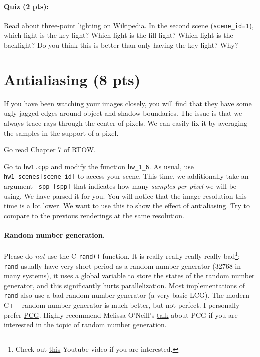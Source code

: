 \paragraph{Quiz (2 pts):} Read about \href{https://en.wikipedia.org/wiki/Three-point_lighting}{three-point lighting} on Wikipedia. In the second scene (\lstinline{scene_id=1}), which light is the key light? Which light is the fill light? Which light is the backlight? Do you think this is better than only having the key light? Why?

\section{Antialiasing (8 pts)}
If you have been watching your images closely, you will find that they have some ugly jagged edges around object and shadow boundaries. The issue is that we always trace rays through the center of pixels. We can easily fix it by averaging the samples in the support of a pixel.

Go read \href{https://raytracing.github.io/books/RayTracingInOneWeekend.html#antialiasing}{Chapter 7} of RTOW.

Go to \lstinline{hw1.cpp} and modify the function \lstinline{hw_1_6}. As usual, use \lstinline{hw1_scenes[scene_id]} to access your scene. This time, we additionally take an argument \lstinline{-spp [spp]} that indicates how many \emph{samples per pixel} we will be using. We have parsed it for you. You will notice that the image resolution this time is a lot lower. We want to use this to show the effect of antialiasing. Try to compare to the previous renderings at the same resolution.

\paragraph{Random number generation.} Please do \emph{not} use the C \lstinline{rand()} function. It is really really really really bad\footnote{Check out \href{https://www.youtube.com/watch?v=LDPMpc-ENqY}{this} Youtube video if you are interested.}: \lstinline{rand} usually have very short period as a random number generator (32768 in many systems), it uses a global variable to store the states of the random number generator, and this significantly hurts parallelization. Most implementations of \lstinline{rand} also use a bad random number generator (a very basic LCG). The modern C++ random number generator is much better, but not perfect. I personally prefer \href{https://www.pcg-random.org/}{PCG}. Highly recommend Melissa O'Neill's \href{https://www.youtube.com/watch?v=45Oet5qjlms}{talk} about PCG if you are interested in the topic of random number generation.

